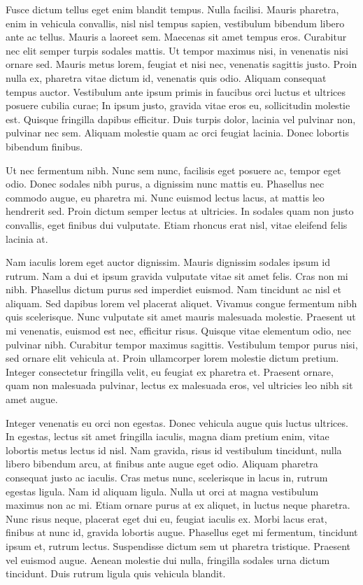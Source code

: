 Fusce dictum tellus eget enim blandit tempus. Nulla facilisi. Mauris pharetra, enim in vehicula convallis, nisl nisl tempus sapien, vestibulum bibendum libero ante ac tellus. Mauris a laoreet sem. Maecenas sit amet tempus eros. Curabitur nec elit semper turpis sodales mattis. Ut tempor maximus nisi, in venenatis nisi ornare sed. Mauris metus lorem, feugiat et nisi nec, venenatis sagittis justo. Proin nulla ex, pharetra vitae dictum id, venenatis quis odio. Aliquam consequat tempus auctor. Vestibulum ante ipsum primis in faucibus orci luctus et ultrices posuere cubilia curae; In ipsum justo, gravida vitae eros eu, sollicitudin molestie est. Quisque fringilla dapibus efficitur. Duis turpis dolor, lacinia vel pulvinar non, pulvinar nec sem. Aliquam molestie quam ac orci feugiat lacinia. Donec lobortis bibendum finibus.

Ut nec fermentum nibh. Nunc sem nunc, facilisis eget posuere ac, tempor eget odio. Donec sodales nibh purus, a dignissim nunc mattis eu. Phasellus nec commodo augue, eu pharetra mi. Nunc euismod lectus lacus, at mattis leo hendrerit sed. Proin dictum semper lectus at ultricies. In sodales quam non justo convallis, eget finibus dui vulputate. Etiam rhoncus erat nisl, vitae eleifend felis lacinia at.

Nam iaculis lorem eget auctor dignissim. Mauris dignissim sodales ipsum id rutrum. Nam a dui et ipsum gravida vulputate vitae sit amet felis. Cras non mi nibh. Phasellus dictum purus sed imperdiet euismod. Nam tincidunt ac nisl et aliquam. Sed dapibus lorem vel placerat aliquet. Vivamus congue fermentum nibh quis scelerisque. Nunc vulputate sit amet mauris malesuada molestie. Praesent ut mi venenatis, euismod est nec, efficitur risus. Quisque vitae elementum odio, nec pulvinar nibh. Curabitur tempor maximus sagittis. Vestibulum tempor purus nisi, sed ornare elit vehicula at. Proin ullamcorper lorem molestie dictum pretium. Integer consectetur fringilla velit, eu feugiat ex pharetra et. Praesent ornare, quam non malesuada pulvinar, lectus ex malesuada eros, vel ultricies leo nibh sit amet augue.

Integer venenatis eu orci non egestas. Donec vehicula augue quis luctus ultrices. In egestas, lectus sit amet fringilla iaculis, magna diam pretium enim, vitae lobortis metus lectus id nisl. Nam gravida, risus id vestibulum tincidunt, nulla libero bibendum arcu, at finibus ante augue eget odio. Aliquam pharetra consequat justo ac iaculis. Cras metus nunc, scelerisque in lacus in, rutrum egestas ligula. Nam id aliquam ligula. Nulla ut orci at magna vestibulum maximus non ac mi. Etiam ornare purus at ex aliquet, in luctus neque pharetra. Nunc risus neque, placerat eget dui eu, feugiat iaculis ex. Morbi lacus erat, finibus at nunc id, gravida lobortis augue. Phasellus eget mi fermentum, tincidunt ipsum et, rutrum lectus. Suspendisse dictum sem ut pharetra tristique. Praesent vel euismod augue. Aenean molestie dui nulla, fringilla sodales urna dictum tincidunt. Duis rutrum ligula quis vehicula blandit.

